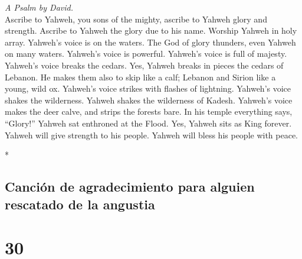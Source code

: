 \begin{paracol}{2}
\begin{otherlanguage}{english}
\emph{A Psalm by David.}\\
 Ascribe to Yahweh, you sons of the mighty, ascribe to
Yahweh glory and strength.  Ascribe to Yahweh the glory
due to his name. Worship Yahweh in holy array.  Yahweh's
voice is on the waters. The God of glory thunders, even Yahweh on many
waters.  Yahweh's voice is powerful. Yahweh's voice is
full of majesty.  Yahweh's voice breaks the cedars. Yes,
Yahweh breaks in pieces the cedars of Lebanon.  He makes
them also to skip like a calf; Lebanon and Sirion like a young, wild ox.
 Yahweh's voice strikes with flashes of lightning.
 Yahweh's voice shakes the wilderness. Yahweh shakes the
wilderness of Kadesh.  Yahweh's voice makes the deer
calve, and strips the forests bare. In his temple everything says,
``Glory!''  Yahweh sat enthroned at the Flood. Yes,
Yahweh sits as King forever.  Yahweh will give strength
to his people. Yahweh will bless his people with peace.

\end{otherlanguage}

\switchcolumn[0]*

\hypertarget{canciuxf3n-de-agradecimiento-para-alguien-rescatado-de-la-angustia}{%
\subsection{Canción de agradecimiento para alguien rescatado de la
angustia}\label{canciuxf3n-de-agradecimiento-para-alguien-rescatado-de-la-angustia}}

\hypertarget{section-58}{%
\section{30}\label{section-58}}


\end{paracol}
